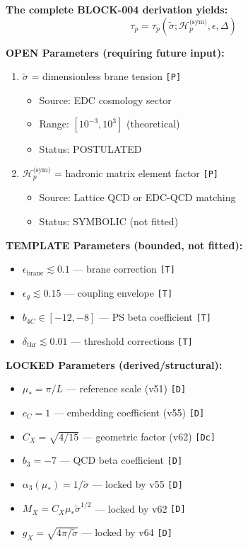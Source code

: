 \documentclass[11pt,a4paper]{article}
\newcommand{\tagD}{\textcolor{green!50!black}{\texttt{[D]}}}
\newcommand{\tagDc}{\textcolor{blue!70!black}{\texttt{[Dc]}}}
\newcommand{\tagP}{\textcolor{orange!80!black}{\texttt{[P]}}}
\newcommand{\tagT}{\textcolor{cyan!70!black}{\texttt{[T]}}}
\theoremstyle{definition}
\begin{document}
\begin{opensurfacebox}
\textbf{The complete BLOCK-004 derivation yields:}
\begin{equation}
\label{eq:open-surface-result}
\boxed{\tau_p = \tau_p(\tilde{\sigma}; \mathcal{H}_p^{\text{(sym)}}, \epsilon, \Delta)}
\end{equation}

\textbf{OPEN Parameters (requiring future input):}
\begin{enumerate}
  \item $\tilde{\sigma}$ = dimensionless brane tension \tagP{}
  \begin{itemize}
    \item Source: EDC cosmology sector
    \item Range: $[10^{-3}, 10^3]$ (theoretical)
    \item Status: POSTULATED
  \end{itemize}
  \item $\mathcal{H}_p^{\text{(sym)}}$ = hadronic matrix element factor \tagP{}
  \begin{itemize}
    \item Source: Lattice QCD or EDC-QCD matching
    \item Status: SYMBOLIC (not fitted)
  \end{itemize}
\end{enumerate}

\textbf{TEMPLATE Parameters (bounded, not fitted):}
\begin{itemize}
  \item $\epsilon_{\text{brane}} \lesssim 0.1$ --- brane correction \tagT{}
  \item $\epsilon_g \lesssim 0.15$ --- coupling envelope \tagT{}
  \item $b_{4C} \in [-12, -8]$ --- PS beta coefficient \tagT{}
  \item $\delta_{\text{thr}} \lesssim 0.01$ --- threshold corrections \tagT{}
\end{itemize}

\textbf{LOCKED Parameters (derived/structural):}
\begin{itemize}
  \item $\mu_* = \pi/L$ --- reference scale (v51) \tagD{}
  \item $c_C = 1$ --- embedding coefficient (v55) \tagD{}
  \item $C_X = \sqrt{4/15}$ --- geometric factor (v62) \tagDc{}
  \item $b_3 = -7$ --- QCD beta coefficient \tagD{}
  \item $\alpha_3(\mu_*) = 1/\tilde{\sigma}$ --- locked by v55 \tagD{}
  \item $M_X = C_X \mu_* \tilde{\sigma}^{1/2}$ --- locked by v62 \tagD{}
  \item $g_X = \sqrt{4\pi/\tilde{\sigma}}$ --- locked by v64 \tagD{}
\end{itemize}


\end{opensurfacebox}
\end{document}
